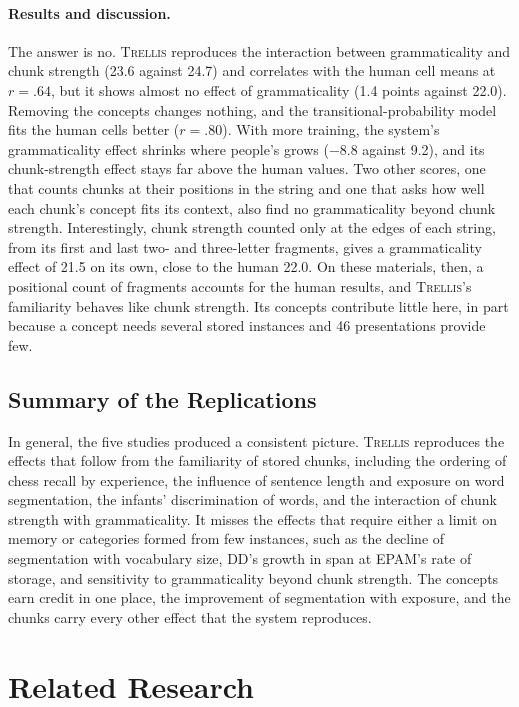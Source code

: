 \documentclass[11pt,letterpaper]{article}
\newcommand{\trellis}{\textsc{Trellis}}
\begin{document}
\paragraph{Results and discussion.} The answer is no. \trellis{} reproduces the interaction
between grammaticality and chunk strength (23.6 against 24.7) and correlates with the
human cell means at $r = .64$, but it shows almost no effect of grammaticality (1.4 points
against 22.0). Removing the concepts changes nothing, and the transitional-probability
model fits the human cells better ($r = .80$). With more training, the system's
grammaticality effect shrinks where people's grows ($-8.8$ against 9.2), and its
chunk-strength effect stays far above the human values. Two other scores, one that counts
chunks at their positions in the string and one that asks how well each chunk's concept
fits its context, also find no grammaticality beyond chunk strength. Interestingly, chunk
strength counted only at the edges of each string, from its first and last two- and
three-letter fragments, gives a grammaticality effect of 21.5 on its own, close to the
human 22.0. On these materials, then, a positional count of fragments accounts for the
human results, and \trellis{}'s familiarity behaves like chunk strength. Its concepts
contribute little here, in part because a concept needs several stored instances and 46
presentations provide few.

\subsection{Summary of the Replications}

In general, the five studies produced a consistent picture. \trellis{} reproduces the
effects that follow from the familiarity of stored chunks, including the ordering of
chess recall by experience, the influence of sentence length and exposure on word
segmentation, the infants' discrimination of words, and the interaction of chunk strength
with grammaticality. It misses the effects that require either a limit on memory or
categories formed from few instances, such as the decline of segmentation with vocabulary
size, DD's growth in span at EPAM's rate of storage, and sensitivity to grammaticality
beyond chunk strength. The concepts earn credit in one place, the improvement of
segmentation with exposure, and the chunks carry every other effect that the system
reproduces.

\section{Related Research}
\end{document}
